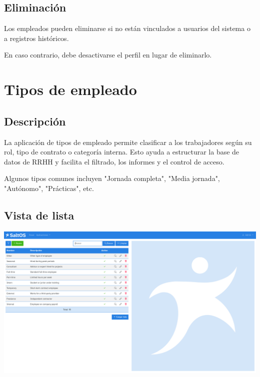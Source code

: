 \documentclass[a4paper]{article}
\begin{document}
\hypertarget{toc110}{}
\subsection{Eliminación}

Los empleados pueden eliminarse si no están vinculados a usuarios del sistema o a registros históricos.

En caso contrario, debe desactivarse el perfil en lugar de eliminarlo.


\hypertarget{toc111}{}
\section{Tipos de empleado}

\hypertarget{toc112}{}
\subsection{Descripción}

La aplicación de tipos de empleado permite clasificar a los trabajadores según su rol, tipo de contrato o categoría interna.
Esto ayuda a estructurar la base de datos de RRHH y facilita el filtrado, los informes y el control de acceso.

Algunos tipos comunes incluyen "Jornada completa", "Media jornada", "Autónomo", "Prácticas", etc.

\hypertarget{toc113}{}
\subsection{Vista de lista}

\begin{center}\includegraphics[width=1\textwidth]{../ujest/snaps/test-screenshots-js-screenshots-hr-employees-types-list-es-es-1-snap.png}\end{center}
\end{document}
